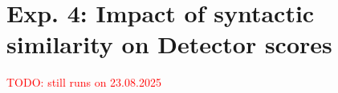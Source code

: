 \section{Exp. 4: Impact of syntactic similarity on \imp{} Detector scores}
\label{sec:syn_sim_impact}

\textcolor{red}{TODO: still runs on 23.08.2025}

%     

%     

%     

%     

%     

%     
